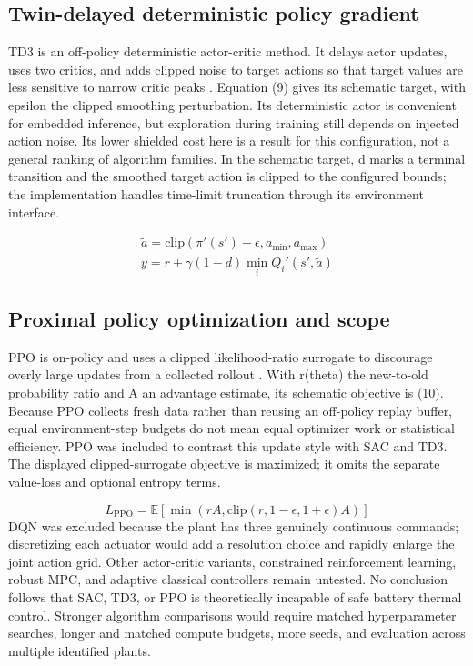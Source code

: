 \documentclass[conference]{IEEEtran}
\begin{document}
\subsection{Twin-delayed deterministic policy gradient}
TD3 is an off-policy deterministic actor-critic method. It delays actor updates, uses two critics, and adds clipped noise to target actions so that target values are less sensitive to narrow critic peaks \cite{r4}. Equation (9) gives its schematic target, with epsilon the clipped smoothing perturbation. Its deterministic actor is convenient for embedded inference, but exploration during training still depends on injected action noise. Its lower shielded cost here is a result for this configuration, not a general ranking of algorithm families. In the schematic target, d marks a terminal transition and the smoothed target action is clipped to the configured bounds; the implementation handles time-limit truncation through its environment interface.

\begin{equation}
\begin{gathered}\widetilde a=\mathrm{clip}(\pi'(s')+\epsilon,a_{\min},a_{\max})\\y=r+\gamma(1-d)\min_i Q_i'(s',\widetilde a)\end{gathered}
\label{eq:9}
\end{equation}
\subsection{Proximal policy optimization and scope}
PPO is on-policy and uses a clipped likelihood-ratio surrogate to discourage overly large updates from a collected rollout \cite{r5}. With r(theta) the new-to-old probability ratio and A an advantage estimate, its schematic objective is (10). Because PPO collects fresh data rather than reusing an off-policy replay buffer, equal environment-step budgets do not mean equal optimizer work or statistical efficiency. PPO was included to contrast this update style with SAC and TD3. The displayed clipped-surrogate objective is maximized; it omits the separate value-loss and optional entropy terms.

\begin{equation}
L_{\mathrm{PPO}}=\mathbb{E}[\min(rA,\mathrm{clip}(r,1-\epsilon,1+\epsilon)A)]
\label{eq:10}
\end{equation}
DQN was excluded because the plant has three genuinely continuous commands; discretizing each actuator would add a resolution choice and rapidly enlarge the joint action grid. Other actor-critic variants, constrained reinforcement learning, robust MPC, and adaptive classical controllers remain untested. No conclusion follows that SAC, TD3, or PPO is theoretically incapable of safe battery thermal control. Stronger algorithm comparisons would require matched hyperparameter searches, longer and matched compute budgets, more seeds, and evaluation across multiple identified plants.
\end{document}
